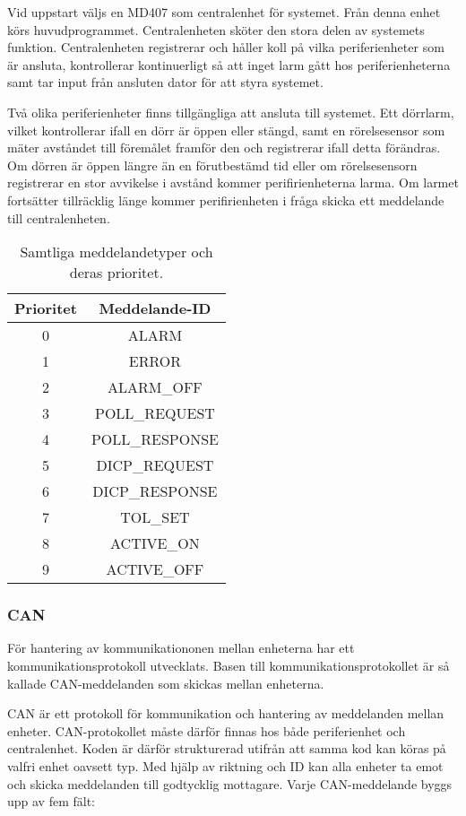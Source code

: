 \documentclass[a4paper]{article}
\begin{document}
Vid uppstart väljs en MD407 som centralenhet för systemet. Från denna enhet körs huvudprogrammet. Centralenheten sköter den stora delen av systemets funktion. Centralenheten registrerar och håller koll på vilka periferienheter som är ansluta, kontrollerar kontinuerligt så att inget larm gått hos periferienheterna samt tar input från ansluten dator för att styra systemet.

Två olika periferienheter finns tillgängliga att ansluta till systemet. Ett dörrlarm, vilket kontrollerar ifall en dörr är öppen eller stängd, samt en rörelsesensor som mäter avståndet till föremålet framför den och registrerar ifall detta förändras. Om dörren är öppen längre än en förutbestämd tid eller om rörelsesensorn registrerar en stor avvikelse i avstånd kommer perifirienheterna larma. Om larmet fortsätter tillräcklig länge kommer perifirienheten i fråga skicka ett meddelande till centralenheten.

\begin{table}
  \centering
  \begin{tabular}{|c|c|}
    \hline
    Prioritet & Meddelande-ID \\
    \hline
    0 & ALARM \\
    \hline
	  1 & ERROR \\
    \hline
	  2 & ALARM\_OFF \\
    \hline
	  3 & POLL\_REQUEST \\
    \hline
	  4 & POLL\_RESPONSE \\
    \hline
    5 & DICP\_REQUEST \\
    \hline
    6 & DICP\_RESPONSE \\
    \hline
    7 & TOL\_SET \\
    \hline
    8 & ACTIVE\_ON \\
    \hline
    9 & ACTIVE\_OFF \\
    \hline
  \end{tabular}
  \caption{Samtliga meddelandetyper och deras prioritet.}
  \label{tab:meddelandetyper}
\end{table}


\subsubsection{CAN}
För hantering av kommunikationonen mellan enheterna har ett kommunikationsprotokoll utvecklats. Basen till kommunikationsprotokollet är så kallade CAN-meddelanden som skickas mellan enheterna.

CAN är ett protokoll för kommunikation och hantering av meddelanden mellan enheter. CAN-protokollet måste därför finnas hos både periferienhet och centralenhet. Koden är därför strukturerad utifrån att samma kod kan köras på valfri enhet oavsett typ. Med hjälp av riktning och ID kan alla enheter ta emot och skicka meddelanden till godtycklig mottagare. Varje CAN-meddelande byggs upp av fem fält:
\end{document}
